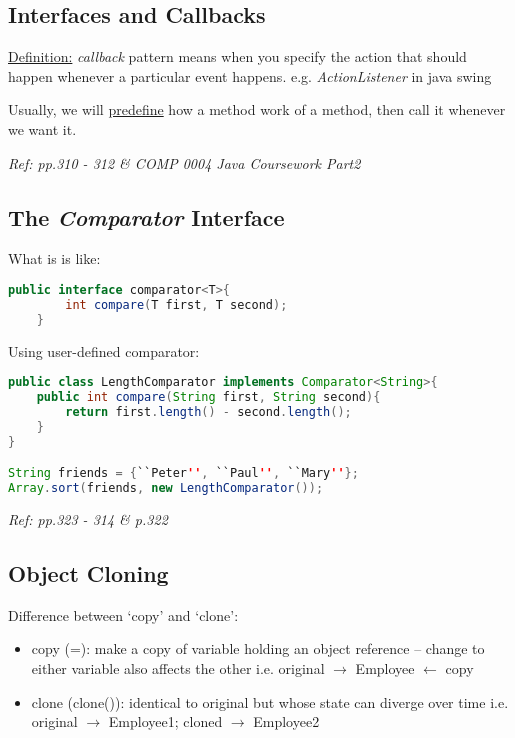 \documentclass[12pt]{article}
\begin{document}
\subsection{Interfaces and Callbacks}
\underline{Definition:} \emph{callback} pattern means when you specify the action that should 
happen whenever a particular event happens. e.g. \emph{ActionListener} in java swing

Usually, we will \underline{predefine} how a method work of a method, then call it whenever we want it. 

\textit{Ref: pp.310 - 312 \& COMP 0004 Java Coursework Part2}

\subsection{The \emph{Comparator} Interface}
What is is like:
\begin{lstlisting}[language=Java]
    public interface comparator<T>{
        int compare(T first, T second);
    }
\end{lstlisting}

Using user-defined comparator:
\begin{lstlisting}[language=Java]
public class LengthComparator implements Comparator<String>{
    public int compare(String first, String second){
        return first.length() - second.length();
    }
}

String friends = {``Peter'', ``Paul'', ``Mary''};
Array.sort(friends, new LengthComparator());
\end{lstlisting}

\emph{Ref: pp.323 - 314 \& p.322}

\subsection{Object Cloning}
Difference between `copy' and `clone':
\begin{itemize}
    \item copy (=): make a copy of variable holding an object reference -- change to either variable also affects the other
    \newline i.e. original $\rightarrow$ Employee $\leftarrow$ copy
    \item clone (clone()): identical to original but whose state can diverge over time
    \newline i.e. original $\rightarrow$ Employee1; cloned $\rightarrow$ Employee2
\end{itemize}
\end{document}
